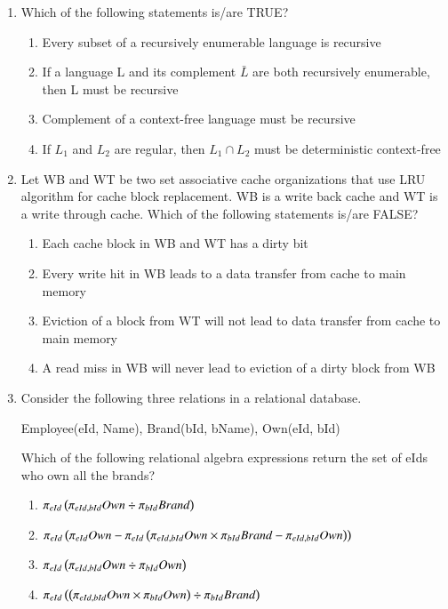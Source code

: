 \begin{enumerate}
\hfill{}

\item Which of the following statements is/are TRUE?  

\begin{enumerate}
\item Every subset of a recursively enumerable language is recursive
\item If a language L and its complement $\bar{L}$ are both recursively enumerable, then L must be recursive
\item Complement of a context-free language must be recursive
\item If $L_1$ and $L_2$ are regular, then $L_1 \cap L_2$ must be deterministic context-free
\end{enumerate}

\hfill{}

\item Let WB and WT be two set associative cache organizations that use LRU algorithm for cache block replacement. WB is a write back cache and WT is a write through cache. Which of the following statements is/are FALSE?  

\begin{enumerate}
\item Each cache block in WB and WT has a dirty bit
\item Every write hit in WB leads to a data transfer from cache to main memory
\item Eviction of a block from WT will not lead to data transfer from cache to main memory
\item A read miss in WB will never lead to eviction of a dirty block from WB
\end{enumerate}

\hfill{}

\item Consider the following three relations in a relational database.  

Employee(eId, Name), Brand(bId, bName), Own(eId, bId)  

Which of the following relational algebra expressions return the set of eIds who own all the brands?  

\begin{enumerate}
\item $\pi_{eId}\left( \pi_{eId,bId}Own \div \pi_{bId}Brand \right)$
\item $\pi_{eId}\left( \pi_{eId}Own - \pi_{eId}\left( \pi_{eId,bId}Own \times \pi_{bId}Brand - \pi_{eId,bId}Own \right) \right)$
\item $\pi_{eId}\left( \pi_{eId,bId}Own \div \pi_{bId}Own \right)$
\item $\pi_{eId}\left( \left(\pi_{eId,bId}Own \times \pi_{bId}Own\right) \div \pi_{bId}Brand \right)$
\end{enumerate}


\end{enumerate}
